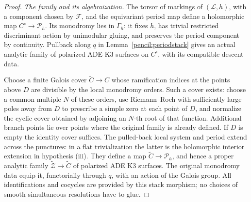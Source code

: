 \documentclass[11pt]{amsart}
\theoremstyle{definition}
\theoremstyle{remark}
\numberwithin{equation}{section}
\begin{document}
\begin{proof}
\emph{The family and its algebraization.}
The torsor of markings of \((\mathcal L,h)\), with a component chosen by
\(\mathcal F\), and the equivariant period map define a holomorphic map
\(C^\circ\to\mathscr P_h\).  Its monodromy lies in \(\Gamma_h\): it fixes
\(h\), has trivial restricted discriminant action by unimodular gluing,
and preserves the period component by continuity.  Pullback along
\(q\) in Lemma~\ref{pencil:periodstack} gives an actual analytic family
of polarized ADE K3 surfaces on \(C^\circ\), with its compatible descent
data.

Choose a finite Galois cover \(\widetilde C\to C\) whose ramification
indices at the points above \(D\) are divisible by the local monodromy
orders.  Such a cover exists: choose a common multiple \(N\) of these
orders, use Riemann--Roch with sufficiently large poles away from \(D\)
to prescribe a simple zero at each point of \(D\), and normalize the
cyclic cover obtained by adjoining an \(N\)-th root of that function.
Additional branch points lie over points where the original family is
already defined.  If \(D\) is empty the identity cover suffices.
The pulled-back local system and period extend across the punctures:
in a flat trivialization the latter is the holomorphic interior
extension in hypothesis \textup{(iii)}.  They define a
map \(\widetilde C\to\mathscr P_h\), and hence a proper analytic family
\(\widetilde{\mathcal Z}\to\widetilde C\) of polarized ADE K3 surfaces.
The original monodromy data equip it, functorially through \(q\), with
an action of the Galois group.  All identifications and cocycles are
provided by this stack morphism; no choices of smooth simultaneous
resolutions have to glue.


\end{proof}
\end{document}
